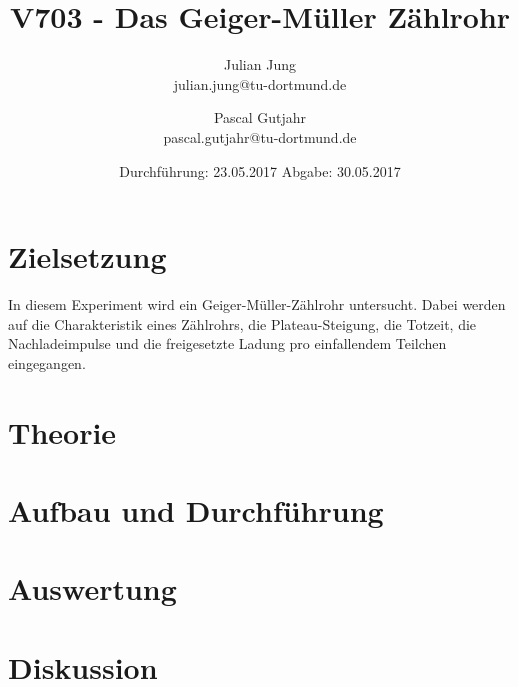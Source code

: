 

\title{V703 - Das Geiger-Müller Zählrohr}
\author{Julian Jung \\ julian.jung@tu-dortmund.de
  \and Pascal Gutjahr \\ pascal.gutjahr@tu-dortmund.de}
  \date{Durchführung: 23.05.2017
  \hspace{3em}
  Abgabe: 30.05.2017}
  
\maketitle
\newpage
\tableofcontents
\newpage
\section{Zielsetzung}
In diesem Experiment wird ein Geiger-Müller-Zählrohr untersucht. Dabei werden auf
die Charakteristik eines Zählrohrs, die Plateau-Steigung, die Totzeit, die
Nachladeimpulse und die freigesetzte Ladung pro einfallendem Teilchen eingegangen.
\section{Theorie}
 
\section{Aufbau und Durchführung}
 
\section{Auswertung}
\section{Diskussion}
% 
\printbibliography

